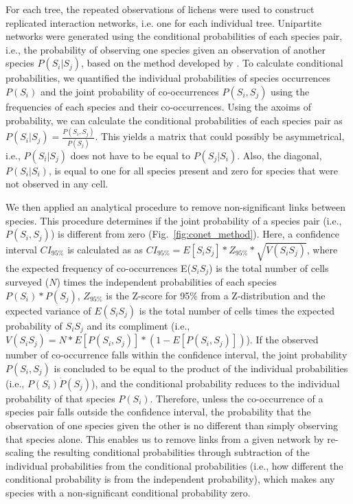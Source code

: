 \documentclass[fleqn,12pt]{olplainarticle}
\begin{document}
For each tree, the repeated observations of lichens were used to
construct replicated interaction networks, i.e. one for each
individual tree. Unipartite networks were generated using the
conditional probabilities of each species pair, i.e., the probability
of observing one species given an observation of another species
$P(S_i | S_j)$, based on the method developed by \cite{Araujo2011}. To
calculate conditional probabilities, we quantified the individual
probabilities of species occurrences $P(S_i)$ and the joint
probability of co-occurrences $P(S_i, S_j)$ using the frequencies of
each species and their co-occurrences. Using the axoims of
probability, we can calculate the conditional probabilities of each
species pair as $P(S_i|S_j) = \frac{P(S_i,S_j)}{P(S_j)}$. This yields
a matrix that could possibly be asymmetrical, i.e., $P(S_i|S_j)$ does
not have to be equal to $P(S_j|S_i)$. Also, the diagonal, $P(S_{i} |
S_{i})$, is equal to one for all species present and zero for species
that were not observed in any cell.

We then applied an analytical procedure to remove non-significant
links between species. This procedure determines if the joint
probability of a species pair (i.e., $P(S_i,S_j)$) is different from
zero (Fig.~\ref{fig:conet_method}).  Here, a confidence interval
$CI_{95\%}$ is calculated as as $CI_{95\%} = E[S_iS_j] * Z_{95\%} *
\sqrt{V(S_iS_j)}$, where the expected frequency of co-occurrences
E($S_iS_j$) is the total number of cells surveyed ($N$) times the
independent probabilities of each species $P(S_i) * P(S_j)$,
$Z_{95\%}$ is the Z-score for 95\% from a Z-distribution and the
expected variance of $E(S_iS_j)$ is the total number of cells times
the expected probability of $S_iS_j$ and its compliment (i.e.,
$V(S_iS_j) = N * E[P(S_i,S_j)] * (1 - E[P(S_i,S_j)])$). If the
observed number of co-occurrence falls within the confidence interval,
the joint probability $P(S_i,S_j)$ is concluded to be equal to the
product of the individual probabilities (i.e., $P(S_i) \dot P(S_j)$),
and the conditional probability reduces to the individual probability
of that species $P(S_i)$. Therefore, unless the co-occurrence of a
species pair falls outside the confidence interval, the probability
that the observation of one species given the other is no different
than simply observing that species alone. This enables us to remove
links from a given network by re-scaling the resulting conditional
probabilities through subtraction of the individual probabilities from
the conditional probabilities (i.e., how different the conditional
probability is from the independent probability), which makes any
species with a non-significant conditional probability zero.
\end{document}
